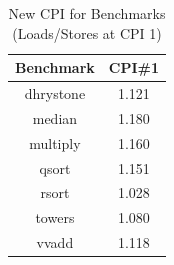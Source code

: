 \begin{table}[ht]
\caption{New CPI for Benchmarks (Loads/Stores at CPI 1)}
\centering
\begin{tabular}{c c}
\hline\hline
Benchmark & CPI\#1 \\ [0.5ex]
\hline
dhrystone & 1.121 \\
median & 1.180 \\
multiply & 1.160 \\
qsort & 1.151 \\
rsort & 1.028 \\
towers & 1.080 \\
vvadd & 1.118 \\
[1ex]
\hline
\end{tabular}
\end{table}
